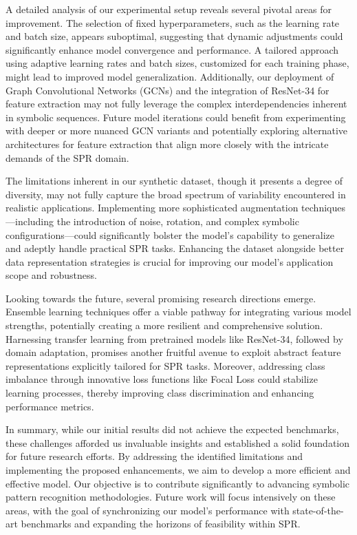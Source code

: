 \documentclass{article}
\begin{document}
A detailed analysis of our experimental setup reveals several pivotal areas for improvement. The selection of fixed hyperparameters, such as the learning rate and batch size, appears suboptimal, suggesting that dynamic adjustments could significantly enhance model convergence and performance. A tailored approach using adaptive learning rates and batch sizes, customized for each training phase, might lead to improved model generalization. Additionally, our deployment of Graph Convolutional Networks (GCNs) and the integration of ResNet-34 for feature extraction may not fully leverage the complex interdependencies inherent in symbolic sequences. Future model iterations could benefit from experimenting with deeper or more nuanced GCN variants and potentially exploring alternative architectures for feature extraction that align more closely with the intricate demands of the SPR domain.

The limitations inherent in our synthetic dataset, though it presents a degree of diversity, may not fully capture the broad spectrum of variability encountered in realistic applications. Implementing more sophisticated augmentation techniques—including the introduction of noise, rotation, and complex symbolic configurations—could significantly bolster the model's capability to generalize and adeptly handle practical SPR tasks. Enhancing the dataset alongside better data representation strategies is crucial for improving our model's application scope and robustness.

Looking towards the future, several promising research directions emerge. Ensemble learning techniques offer a viable pathway for integrating various model strengths, potentially creating a more resilient and comprehensive solution. Harnessing transfer learning from pretrained models like ResNet-34, followed by domain adaptation, promises another fruitful avenue to exploit abstract feature representations explicitly tailored for SPR tasks. Moreover, addressing class imbalance through innovative loss functions like Focal Loss could stabilize learning processes, thereby improving class discrimination and enhancing performance metrics. 

In summary, while our initial results did not achieve the expected benchmarks, these challenges afforded us invaluable insights and established a solid foundation for future research efforts. By addressing the identified limitations and implementing the proposed enhancements, we aim to develop a more efficient and effective model. Our objective is to contribute significantly to advancing symbolic pattern recognition methodologies. Future work will focus intensively on these areas, with the goal of synchronizing our model's performance with state-of-the-art benchmarks and expanding the horizons of feasibility within SPR.
\end{document}
